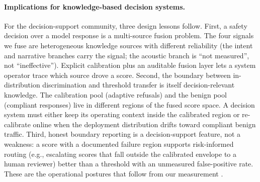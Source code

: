 \paragraph{Implications for knowledge-based decision systems.}
For the decision-support community, three design lessons follow. First, a
safety decision over a model response is a multi-source fusion problem. The
four signals we fuse are heterogeneous knowledge sources with different
reliability (the intent and narrative branches carry the signal; the acoustic
branch is ``not measured'', not ``ineffective''). Explicit calibration
plus an auditable fusion layer lets a system operator trace which source
drove a score. Second, the boundary between in-distribution discrimination and
threshold transfer is itself decision-relevant knowledge. The calibration pool
(adaptive refusals) and the benign pool (compliant responses) live in different
regions of the fused score space. A decision system must either keep its
operating context inside the calibrated region or re-calibrate online when the
deployment distribution drifts toward compliant benign traffic. Third, honest
boundary reporting is a decision-support feature, not a weakness: a score with
a documented failure region supports risk-informed routing (e.g., escalating
scores that fall outside the calibrated envelope to a human reviewer) better
than a threshold with an unmeasured false-positive rate. These are the
operational postures that follow from our measurement
\citep{guo2024survey,shafer1976,xu2025promethee}.
